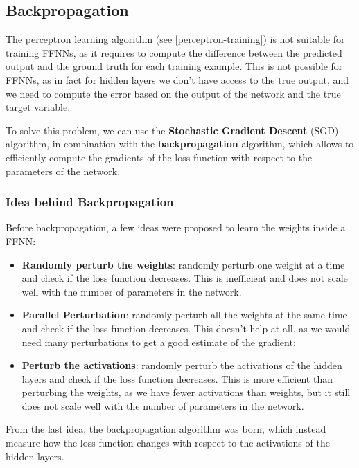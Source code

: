 \subsection{Backpropagation}
The perceptron learning algorithm (see \ref{perceptron-training}) is not suitable for training FFNNs,
as it requires to compute the difference between the predicted output and the ground truth for each training example.
This is not possible for FFNNs, as in fact for hidden layers we don't have access to the true output, and we need to compute 
the error based on the output of the network and the true target variable.

To solve this problem, we can use the \textbf{Stochastic Gradient Descent} (SGD) algorithm, in combination with the \textbf{backpropagation} algorithm, 
which allows to efficiently compute the gradients of the loss function with respect to the parameters of the network.
\subsubsection{Idea behind Backpropagation}
Before backpropagation, a few ideas were proposed to learn the weights inside a FFNN:
\begin{itemize}
    \item \textbf{Randomly perturb the weights}: randomly perturb one weight at a time and check
    if the loss function decreases. This is inefficient and does not scale well with the number of parameters in the network.
    \item \textbf{Parallel Perturbation}: randomly perturb all the weights at the same time and check if the loss function decreases.
    This doesn't help at all, as we would need many perturbations to get a good estimate of the gradient;
    \item \textbf{Perturb the activations}: randomly perturb the activations of the hidden layers and check if the loss function decreases. 
    This is more efficient than perturbing the weights, as we have fewer activations than weights, but it still does not scale well with the number of parameters in the network.
\end{itemize}
From the last idea, the backpropagation algorithm was born, which instead measure how the loss function changes with respect to the activations of the hidden layers.

